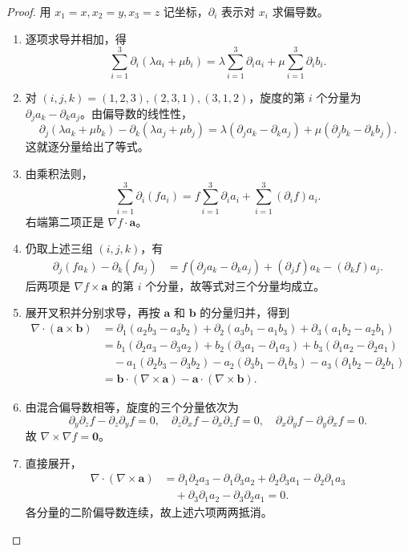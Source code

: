 \begin{proof}
用 $x_1=x,x_2=y,x_3=z$ 记坐标，$\partial_i$ 表示对 $x_i$ 求偏导数。
\begin{enumerate}
\item 逐项求导并相加，得
\[
\sum_{i=1}^3\partial_i(\lambda a_i+\mu b_i)
=\lambda\sum_{i=1}^3\partial_i a_i+\mu\sum_{i=1}^3\partial_i b_i.
\]
\item 对 $(i,j,k)=(1,2,3),(2,3,1),(3,1,2)$，旋度的第 $i$ 个分量为 $\partial_j a_k-\partial_k a_j$。由偏导数的线性性，
\[
\partial_j(\lambda a_k+\mu b_k)-\partial_k(\lambda a_j+\mu b_j)
=\lambda(\partial_j a_k-\partial_k a_j)+\mu(\partial_j b_k-\partial_k b_j).
\]
这就逐分量给出了等式。
\item 由乘积法则，
\[
\sum_{i=1}^3\partial_i(fa_i)
=f\sum_{i=1}^3\partial_i a_i+\sum_{i=1}^3(\partial_i f)a_i.
\]
右端第二项正是 $\nabla f\cdot\boldsymbol a$。
\item 仍取上述三组 $(i,j,k)$，有
\begin{align*}
\partial_j(fa_k)-\partial_k(fa_j)
&=f(\partial_j a_k-\partial_k a_j)
 +(\partial_jf)a_k-(\partial_kf)a_j.
\end{align*}
后两项是 $\nabla f\times\boldsymbol a$ 的第 $i$ 个分量，故等式对三个分量均成立。
\item 展开叉积并分别求导，再按 $\boldsymbol a$ 和 $\boldsymbol b$ 的分量归并，得到
\begin{align*}
\nabla\cdot(\boldsymbol a\times\boldsymbol b)
&=\partial_1(a_2b_3-a_3b_2)+\partial_2(a_3b_1-a_1b_3)
 +\partial_3(a_1b_2-a_2b_1)\\
&=b_1(\partial_2a_3-\partial_3a_2)+b_2(\partial_3a_1-\partial_1a_3)
 +b_3(\partial_1a_2-\partial_2a_1)\\
&\quad-a_1(\partial_2b_3-\partial_3b_2)-a_2(\partial_3b_1-\partial_1b_3)
 -a_3(\partial_1b_2-\partial_2b_1)\\
&=\boldsymbol b\cdot(\nabla\times\boldsymbol a)-\boldsymbol a\cdot(\nabla\times\boldsymbol b).
\end{align*}
\item 由混合偏导数相等，旋度的三个分量依次为
\[
\partial_y\partial_zf-\partial_z\partial_yf=0,\quad
\partial_z\partial_xf-\partial_x\partial_zf=0,\quad
\partial_x\partial_yf-\partial_y\partial_xf=0.
\]
故 $\nabla\times\nabla f=\boldsymbol0$。
\item 直接展开，
\begin{align*}
\nabla\cdot(\nabla\times\boldsymbol a)
&=\partial_1\partial_2a_3-\partial_1\partial_3a_2
 +\partial_2\partial_3a_1-\partial_2\partial_1a_3\\
&\quad+\partial_3\partial_1a_2-\partial_3\partial_2a_1=0.
\end{align*}
各分量的二阶偏导数连续，故上述六项两两抵消。
\end{enumerate}
\end{proof}

